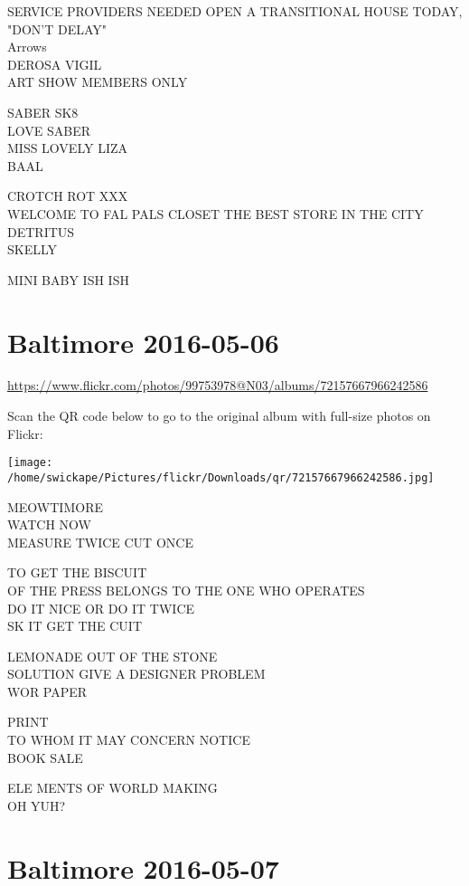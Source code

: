 \documentclass[10pt,letterpaper]{article}
\begin{document}
SERVICE PROVIDERS NEEDED OPEN A TRANSITIONAL HOUSE TODAY, "DON'T DELAY"\\
Arrows\\
DEROSA VIGIL\\
ART SHOW MEMBERS ONLY

SABER SK8\\
LOVE SABER\\
MISS LOVELY LIZA\\
BAAL

CROTCH ROT XXX\\
WELCOME TO FAL PALS CLOSET THE BEST STORE IN THE CITY\\
DETRITUS\\
SKELLY

MINI BABY ISH ISH
\pagebreak

\section*{Baltimore 2016-05-06}

\url{https://www.flickr.com/photos/99753978@N03/albums/72157667966242586}

Scan the QR code below to go to the original album with full-size photos on Flickr:

\texttt{[image: /home/swickape/Pictures/flickr/Downloads/qr/72157667966242586.jpg]}
\pagebreak

MEOWTIMORE\\
WATCH NOW\\
MEASURE TWICE CUT ONCE

TO GET THE BISCUIT\\
OF THE PRESS BELONGS TO THE ONE WHO OPERATES\\
DO IT NICE OR DO IT TWICE\\
SK IT GET THE CUIT

LEMONADE OUT OF THE STONE\\
SOLUTION GIVE A DESIGNER PROBLEM\\
WOR PAPER

PRINT\\
TO WHOM IT MAY CONCERN NOTICE\\
BOOK SALE

ELE MENTS OF WORLD MAKING\\
OH YUH?
\pagebreak

\section*{Baltimore 2016-05-07}
\end{document}
